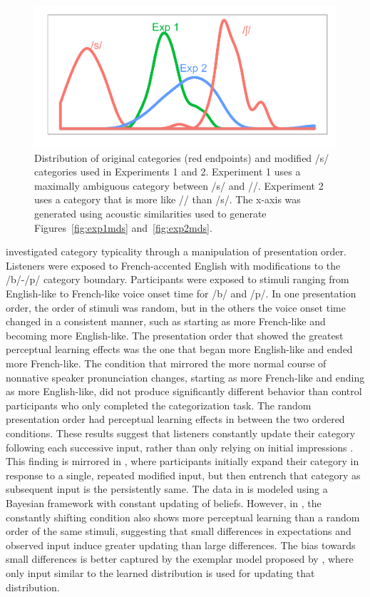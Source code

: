 \begin{figure}[!ht]
\caption{Distribution of original categories (red endpoints) and modified /s/ categories used in Experiments 1 and 2.  Experiment 1 uses a maximally ambiguous category between /s/ and /\textesh/.  Experiment 2 uses a category that is more like /\textesh/ than /s/.  The x-axis was generated using acoustic similarities used to generate Figures~\ref{fig:exp1mds} and~\ref{fig:exp2mds}.}
\label{fig:salience}
\begin{center}
\includegraphics[width=1.0\textwidth]{graphs/salience}
\end{center}
\end{figure}

\citet{Sumner2011} investigated category typicality through a manipulation of presentation order. 
Listeners were exposed to French-accented English with modifications to the /b/-/p/ category boundary.
Participants were exposed to stimuli ranging from English-like to French-like voice onset time for /b/ and /p/.
In one presentation order, the order of stimuli was random, but in the others the voice onset time changed in a consistent manner, such as starting as more French-like and becoming more English-like.
The presentation order that showed the greatest perceptual learning effects was the one that began more English-like and ended more French-like.
The condition that mirrored the more normal course of nonnative speaker pronunciation changes, starting as more French-like and ending as more English-like, did not produce significantly different behavior than control participants who only completed the categorization task.
The random presentation order had perceptual learning effects in between the two ordered conditions.
These results suggest that listeners constantly update their category following each successive input, rather than only relying on initial impressions \citep[contra][]{Kraljic2008}.
This finding is mirrored in \citet{Vroomen2007}, where participants initially expand their category in response to a single, repeated modified input, but then entrench that category as subsequent input is the persistently same.
The data in \citet{Vroomen2007} is modeled using a Bayesian framework with constant updating of beliefs.
However, in \citet{Sumner2011}, the constantly shifting condition also shows more perceptual learning than a random order of the same stimuli, suggesting that small differences in expectations and observed input induce greater updating than large differences.
The bias towards small differences is better captured by the exemplar model proposed by \citet{Pierrehumbert2001}, where only input similar to the learned distribution is used for updating that distribution.


